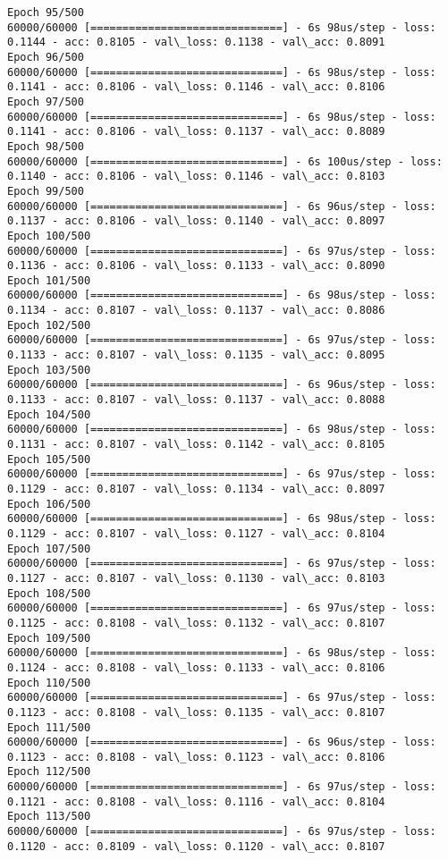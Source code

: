 \documentclass[11pt]{article}
\begin{document}
\begin{Verbatim}[commandchars=\\\{\}]
Epoch 95/500
60000/60000 [==============================] - 6s 98us/step - loss: 0.1144 - acc: 0.8105 - val\_loss: 0.1138 - val\_acc: 0.8091
Epoch 96/500
60000/60000 [==============================] - 6s 98us/step - loss: 0.1141 - acc: 0.8106 - val\_loss: 0.1146 - val\_acc: 0.8106
Epoch 97/500
60000/60000 [==============================] - 6s 98us/step - loss: 0.1141 - acc: 0.8106 - val\_loss: 0.1137 - val\_acc: 0.8089
Epoch 98/500
60000/60000 [==============================] - 6s 100us/step - loss: 0.1140 - acc: 0.8106 - val\_loss: 0.1146 - val\_acc: 0.8103
Epoch 99/500
60000/60000 [==============================] - 6s 96us/step - loss: 0.1137 - acc: 0.8106 - val\_loss: 0.1140 - val\_acc: 0.8097
Epoch 100/500
60000/60000 [==============================] - 6s 97us/step - loss: 0.1136 - acc: 0.8106 - val\_loss: 0.1133 - val\_acc: 0.8090
Epoch 101/500
60000/60000 [==============================] - 6s 98us/step - loss: 0.1134 - acc: 0.8107 - val\_loss: 0.1137 - val\_acc: 0.8086
Epoch 102/500
60000/60000 [==============================] - 6s 97us/step - loss: 0.1133 - acc: 0.8107 - val\_loss: 0.1135 - val\_acc: 0.8095
Epoch 103/500
60000/60000 [==============================] - 6s 96us/step - loss: 0.1133 - acc: 0.8107 - val\_loss: 0.1137 - val\_acc: 0.8088
Epoch 104/500
60000/60000 [==============================] - 6s 98us/step - loss: 0.1131 - acc: 0.8107 - val\_loss: 0.1142 - val\_acc: 0.8105
Epoch 105/500
60000/60000 [==============================] - 6s 97us/step - loss: 0.1129 - acc: 0.8107 - val\_loss: 0.1134 - val\_acc: 0.8097
Epoch 106/500
60000/60000 [==============================] - 6s 98us/step - loss: 0.1129 - acc: 0.8107 - val\_loss: 0.1127 - val\_acc: 0.8104
Epoch 107/500
60000/60000 [==============================] - 6s 97us/step - loss: 0.1127 - acc: 0.8107 - val\_loss: 0.1130 - val\_acc: 0.8103
Epoch 108/500
60000/60000 [==============================] - 6s 97us/step - loss: 0.1125 - acc: 0.8108 - val\_loss: 0.1132 - val\_acc: 0.8107
Epoch 109/500
60000/60000 [==============================] - 6s 98us/step - loss: 0.1124 - acc: 0.8108 - val\_loss: 0.1133 - val\_acc: 0.8106
Epoch 110/500
60000/60000 [==============================] - 6s 97us/step - loss: 0.1123 - acc: 0.8108 - val\_loss: 0.1135 - val\_acc: 0.8107
Epoch 111/500
60000/60000 [==============================] - 6s 96us/step - loss: 0.1123 - acc: 0.8108 - val\_loss: 0.1123 - val\_acc: 0.8106
Epoch 112/500
60000/60000 [==============================] - 6s 97us/step - loss: 0.1121 - acc: 0.8108 - val\_loss: 0.1116 - val\_acc: 0.8104
Epoch 113/500
60000/60000 [==============================] - 6s 97us/step - loss: 0.1120 - acc: 0.8109 - val\_loss: 0.1120 - val\_acc: 0.8107

\end{Verbatim}
\end{document}
